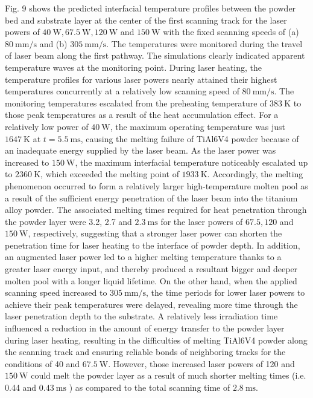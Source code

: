 \documentclass[10pt]{article}
\begin{document}
Fig. 9 shows the predicted interfacial temperature profiles between the powder bed and substrate layer at the center of the first scanning track for the laser powers of $40 \mathrm{~W}, 67.5 \mathrm{~W}, 120 \mathrm{~W}$ and $150 \mathrm{~W}$ with the fixed scanning speeds of (a) $80 \mathrm{~mm} / \mathrm{s}$ and (b) $305 \mathrm{~mm} / \mathrm{s}$. The temperatures were monitored during the travel of laser beam along the first pathway. The simulations clearly indicated apparent temperature waves at the monitoring point. During laser heating, the temperature profiles for various laser powers nearly attained their highest temperatures concurrently at a relatively low scanning speed of $80 \mathrm{~mm} / \mathrm{s}$. The monitoring temperatures escalated from the preheating temperature of $383 \mathrm{~K}$ to those peak temperatures as a result of the heat accumulation effect. For a relatively low power of $40 \mathrm{~W}$, the maximum operating temperature was just $1647 \mathrm{~K}$ at $t=5.5 \mathrm{~ms}$, causing the melting failure of TiAl6V4 powder because of an inadequate energy supplied by the laser beam. As the laser power was increased to $150 \mathrm{~W}$, the maximum interfacial temperature noticeably escalated up to $2360 \mathrm{~K}$, which exceeded the melting point of $1933 \mathrm{~K}$. Accordingly, the melting phenomenon occurred to form a relatively larger high-temperature molten pool as a result of the sufficient energy penetration of the laser beam into the titanium alloy powder. The associated melting times required for heat penetration through the powder layer were 3.2, 2.7 and $2.3 \mathrm{~ms}$ for the laser powers of $67.5,120$ and $150 \mathrm{~W}$, respectively, suggesting that a stronger laser power can shorten the penetration time for laser heating to the interface of powder depth. In addition, an augmented laser power led to a higher melting temperature thanks to a greater laser energy input, and thereby produced a resultant bigger and deeper molten pool with a longer liquid lifetime. On the other hand, when the applied scanning speed increased to $305 \mathrm{~mm} / \mathrm{s}$, the time periods for lower laser powers to achieve their peak temperatures were delayed, revealing more time through the laser penetration depth to the substrate. A relatively less irradiation time influenced a reduction in the amount of energy transfer to the powder layer during laser heating, resulting in the difficulties of melting TiAl6V4 powder along the scanning track and ensuring reliable bonds of neighboring tracks for the conditions of 40 and $67.5 \mathrm{~W}$. However, those increased laser powers of 120 and $150 \mathrm{~W}$ could melt the powder layer as a result of much shorter melting times (i.e. 0.44 and $0.43 \mathrm{~ms}$ ) as compared to the total scanning time of $2.8 \mathrm{~ms}$.
\end{document}
